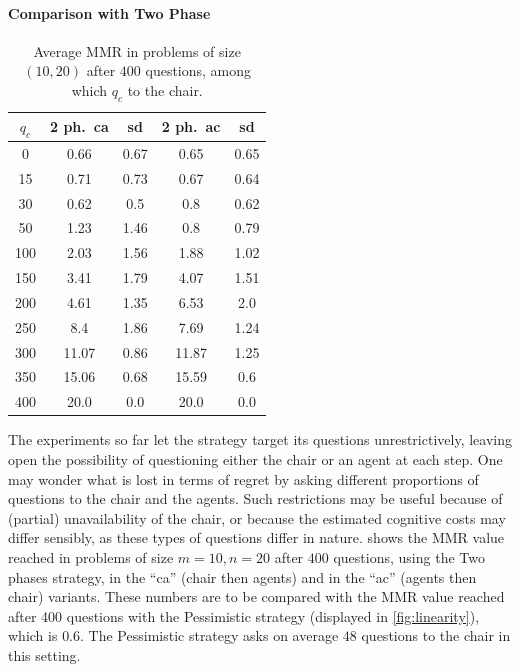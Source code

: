 \documentclass[sigconf, anonymous]{aamas}
\begin{document}
\paragraph{Comparison with Two Phase}
\begin{table}
	\caption{Average MMR in problems of size $(10, 20)$ after $400$ questions, among which $q_c$ to the chair.}
	\label{tab:twoP400}
	\begin{tabular}{S[table-figures-integer=3, table-figures-decimal=0]S[table-number-alignment = right]@{ ± }S[table-number-alignment = left, table-figures-integer=1]S[table-number-alignment = right]@{ ± }S[table-number-alignment = left, table-figures-integer=1]}
		\toprule
		{$q_c$} & {2 ph.\ ca} & {sd} & {2 ph.\ ac} & {sd} \\
		 & 0.66 & 0.67 & 0.65 & 0.65  \\
		15 & 0.71 & 0.73 & 0.67	& 0.64 \\
		30 & 0.62 & 0.5 & 0.8 & 0.62 \\
		50 & 1.23 & 1.46 & 0.8 & 0.79 \\
		100 & 2.03 & 1.56 & 1.88 & 1.02  \\
		150 & 3.41 & 1.79 & 4.07 & 1.51 \\
		200 & 4.61	& 1.35  & 6.53 & 2.0  \\
		250 & 8.4 & 1.86 & 	7.69 & 1.24 \\
		300 &11.07 & 0.86& 11.87 & 1.25 \\
		350 &15.06 & 0.68&15.59 & 0.6 \\
		400 &20.0 & 0.0 & 20.0 & 0.0 \\
		\bottomrule
	\end{tabular}
\end{table}

The experiments so far let the strategy target its questions unrestrictively, leaving open the possibility of questioning either the chair or an agent at each step. One may wonder what is lost in terms of regret by asking different proportions of questions to the chair and the agents. Such restrictions may be useful because of (partial) unavailability of the chair, or because the estimated cognitive costs may differ sensibly, as these types of questions differ in nature. 
 shows the MMR value reached in problems of size $m = 10, n = 20$ after $400$ questions, using the Two phases strategy, in the “ca” (chair then agents) and in the “ac” (agents then chair) variants. These numbers are to be compared with the MMR value reached after 400 questions with the Pessimistic strategy (displayed in \cref{fig:linearity}), which is $0.6$.
The Pessimistic strategy asks on average $48$ questions to the chair in this setting.
\end{document}
